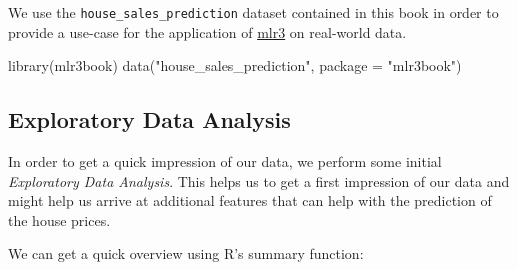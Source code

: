 \documentclass[
  11pt,
  parskip=half,
  DIV=calc,
  BCOR=10mm,
  x11names]{scrbook}
\newenvironment{Shaded}{}{}
\newcommand{\DataTypeTok}[1]{#1}
\newcommand{\KeywordTok}[1]{\textcolor[rgb]{0.00,0.00,1.00}{#1}}
\newcommand{\NormalTok}[1]{#1}
\newcommand{\StringTok}[1]{\textcolor[rgb]{0.00,0.50,0.50}{#1}}
\begin{document}
We use the \texttt{house\_sales\_prediction} dataset contained in this book in order to provide a use-case for the application of \href{https://mlr3.mlr-org.com}{mlr3} on real-world data.

\begin{Shaded}
\begin{Highlighting}[]
\KeywordTok{library}\NormalTok{(mlr3book)}
\KeywordTok{data}\NormalTok{(}\StringTok{"house_sales_prediction"}\NormalTok{, }\DataTypeTok{package =} \StringTok{"mlr3book"}\NormalTok{)}
\end{Highlighting}
\end{Shaded}

\hypertarget{exploratory-data-analysis}{%
\subsection{Exploratory Data Analysis}\label{exploratory-data-analysis}}

In order to get a quick impression of our data, we perform some initial \emph{Exploratory Data Analysis}.
This helps us to get a first impression of our data and might help us arrive at additional features that can help with the prediction of the house prices.

We can get a quick overview using R's summary function:
\end{document}
